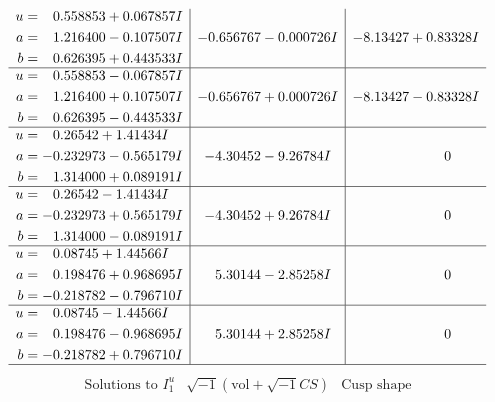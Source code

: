 \documentclass[1p]{elsarticle_modified}
\theoremstyle{definition}
\newcommand{\I}{\sqrt{-1}}
\begin{document}
$$\begin{array}{c|c|c}
\begin{aligned}
u &= \phantom{-}0.558853 + 0.067857 I \\
a &= \phantom{-}1.216400 - 0.107507 I \\
b &= \phantom{-}0.626395 + 0.443533 I\end{aligned}
 & -0.656767 - 0.000726 I & -8.13427 + 0.83328 I \\ \hline\begin{aligned}
u &= \phantom{-}0.558853 - 0.067857 I \\
a &= \phantom{-}1.216400 + 0.107507 I \\
b &= \phantom{-}0.626395 - 0.443533 I\end{aligned}
 & -0.656767 + 0.000726 I & -8.13427 - 0.83328 I \\ \hline\begin{aligned}
u &= \phantom{-}0.26542 + 1.41434 I \\
a &= -0.232973 - 0.565179 I \\
b &= \phantom{-}1.314000 + 0.089191 I\end{aligned}
 & -4.30452 - 9.26784 I & \phantom{-0.000000 } 0 \\ \hline\begin{aligned}
u &= \phantom{-}0.26542 - 1.41434 I \\
a &= -0.232973 + 0.565179 I \\
b &= \phantom{-}1.314000 - 0.089191 I\end{aligned}
 & -4.30452 + 9.26784 I & \phantom{-0.000000 } 0 \\ \hline\begin{aligned}
u &= \phantom{-}0.08745 + 1.44566 I \\
a &= \phantom{-}0.198476 + 0.968695 I \\
b &= -0.218782 - 0.796710 I\end{aligned}
 & \phantom{-}5.30144 - 2.85258 I & \phantom{-0.000000 } 0 \\ \hline\begin{aligned}
u &= \phantom{-}0.08745 - 1.44566 I \\
a &= \phantom{-}0.198476 - 0.968695 I \\
b &= -0.218782 + 0.796710 I\end{aligned}
 & \phantom{-}5.30144 + 2.85258 I & \phantom{-0.000000 } 0\\
 \hline 
 \end{array}$$\newpage$$\begin{array}{c|c|c}  
\text{Solutions to }I^u_{1}& \I (\text{vol} + \sqrt{-1}CS) & \text{Cusp shape}\\

\end{array}$$
\end{document}
